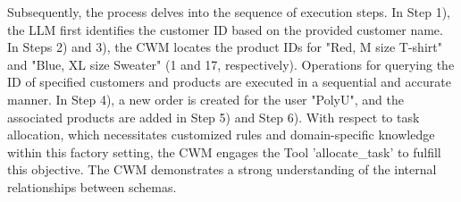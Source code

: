 \documentclass[preprint,12pt]{elsarticle}
\begin{document}
Subsequently, the process delves into the sequence of execution steps.
In Step 1), the LLM first identifies the customer ID based on the provided customer name. 
In Steps 2) and 3), the CWM locates the product IDs for "Red, M size T-shirt" and "Blue, XL size Sweater" (1 and 17, respectively). 
Operations for querying the ID of specified customers and products are executed in a sequential and accurate manner.
In Step 4), a new order is created for the user "PolyU", and the associated products are added in Step 5) and Step 6). 
With respect to task allocation, which necessitates customized rules and domain-specific knowledge within this factory setting, the CWM engages the Tool 'allocate\_task' to fulfill this objective.
The CWM demonstrates a strong understanding of the internal relationships between schemas.



\end{document}
